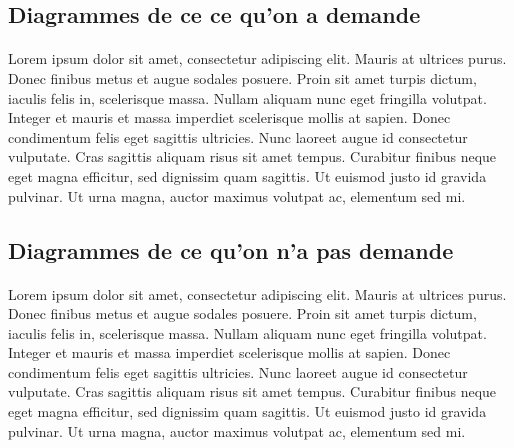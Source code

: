 \subsection{Diagrammes de ce ce qu'on a demande}
\paragraph{} 
Lorem ipsum dolor sit amet, consectetur adipiscing elit. Mauris at ultrices purus. Donec finibus metus et augue sodales posuere. Proin sit amet turpis dictum, iaculis felis in, scelerisque massa. Nullam aliquam nunc eget fringilla volutpat. Integer et mauris et massa imperdiet scelerisque mollis at sapien. Donec condimentum felis eget sagittis ultricies. Nunc laoreet augue id consectetur vulputate. Cras sagittis aliquam risus sit amet tempus. Curabitur finibus neque eget magna efficitur, sed dignissim quam sagittis. Ut euismod justo id gravida pulvinar. Ut urna magna, auctor maximus volutpat ac, elementum sed mi.
\subsection{Diagrammes de ce qu'on n'a pas demande}
\paragraph{} 
Lorem ipsum dolor sit amet, consectetur adipiscing elit. Mauris at ultrices purus. Donec finibus metus et augue sodales posuere. Proin sit amet turpis dictum, iaculis felis in, scelerisque massa. Nullam aliquam nunc eget fringilla volutpat. Integer et mauris et massa imperdiet scelerisque mollis at sapien. Donec condimentum felis eget sagittis ultricies. Nunc laoreet augue id consectetur vulputate. Cras sagittis aliquam risus sit amet tempus. Curabitur finibus neque eget magna efficitur, sed dignissim quam sagittis. Ut euismod justo id gravida pulvinar. Ut urna magna, auctor maximus volutpat ac, elementum sed mi.
